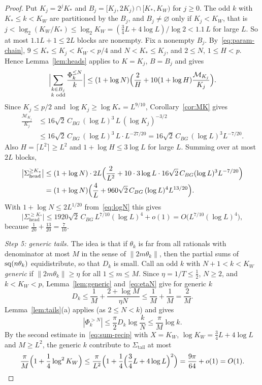 \begin{proof}
Put $K_j=2^jK_*$ and $B_j=[K_j,2K_j)\cap[K_*,K_W)$ for $j\ge0$. The odd $k$ with $K_*\le k<K_W$ are partitioned by the $B_j$, and $B_j\ne\varnothing$ only if $K_j<K_W$, that is $j<\log_2(K_W/K_*)\le\log_2K_W=(\frac34L+4\log L)/\log2<1.1\,L$ for large $L$. So at most $1.1L+1\le2L$ blocks are nonempty. Fix a nonempty $B_j$. By~\eqref{eq:param-chain}, $9\le K_*\le K_j<K_W<p/4$ and $N<K_*\le K_j$, and $2\le N$, $1\le H<p$. Hence Lemma~\ref{lem:heads} applies to $K=K_j$, $B=B_j$ and gives
\[
\Bigl|\sum_{\substack{k\in B_j\\ k\text{ odd}}}\frac{\Phi_k^{\le N}}k\Bigr|\le(1+\log N)\Bigl(\frac2H+10(1+\log H)\frac{\mathcal M_{K_j}}{K_j}\Bigr).
\]
Since $K_j\le p/2$ and $\log K_j\ge\log K_*=L^{9/10}$, Corollary~\ref{cor:MK} gives
\begin{align*}
\frac{\mathcal M_{K_j}}{K_j}&\le16\sqrt2\,C_{BG}\,(\log L)^3\,L\,(\log K_j)^{-3/2}\\
&\le16\sqrt2\,C_{BG}\,(\log L)^3\,L\cdot L^{-27/20}=16\sqrt2\,C_{BG}\,(\log L)^3L^{-7/20}.
\end{align*}
Also $H=\lceil L^2\rceil\ge L^2$ and $1+\log H\le3\log L$ for large $L$. Summing over at most $2L$ blocks,
\begin{align*}
\bigl|\Sigma_{\mathrm{head}}^{\ge K_*}\bigr|
&\le(1+\log N)\cdot2L\Bigl(\frac2{L^2}+10\cdot3\log L\cdot16\sqrt2\,C_{BG}(\log L)^3L^{-7/20}\Bigr)\\
&=(1+\log N)\Bigl(\frac4L+960\sqrt2\,C_{BG}\,(\log L)^4L^{13/20}\Bigr).
\end{align*}
With $1+\log N\le2L^{1/20}$ from~\eqref{eq:logN} this gives
\begin{equation}\label{eq:head-high}
\bigl|\Sigma_{\mathrm{head}}^{\ge K_*}\bigr|\le1920\sqrt2\,C_{BG}\,L^{7/10}(\log L)^4+o(1)=O\bigl(L^{7/10}(\log L)^4\bigr),
\end{equation}
because $\frac1{20}+\frac{13}{20}=\frac7{10}$.

\smallskip
\emph{Step 5: generic tails.} The idea is that if $\theta_k$ is far from all rationals with denominator at most $M$ in the sense of $\|2m\theta_k\|$, then the partial sums of $\operatorname{sq}(n\theta_k)$ equidistribute, so that $D_k$ is small. Call an odd $k$ with $N+1<k<K_W$ \emph{generic} if $\|2m\theta_k\|\ge\eta$ for all $1\le m\le M$. Since $\eta=1/T\le\frac12$, $N\ge2$, and $k<K_W<p$, Lemma~\ref{lem:generic} and~\eqref{eq:etaN} give for generic $k$
\[
D_k\le\frac1M+\frac{2+\log M}{\eta N}\le\frac1M+\frac1M=\frac2M .
\]
Lemma~\ref{lem:tails}(a) applies (as $2\le N<k$) and gives
\[
|\Phi_k^{>N}|\le\frac\pi2D_k\log\frac kN\le\frac\pi M\log k .
\]
By the second estimate in~\eqref{eq:sum-recip} with $X=K_W$, $\log K_W=\frac34L+4\log L$ and $M\ge L^2$, the generic $k$ contribute to $\Sigma_{\mathrm{tail}}$ at most
\begin{equation}\label{eq:generic}
\frac\pi M\Bigl(1+\frac14\log^2K_W\Bigr)\le\frac\pi{L^2}\Bigl(1+\frac14\Bigl(\frac34L+4\log L\Bigr)^2\Bigr)=\frac{9\pi}{64}+o(1)=O(1).
\end{equation}


\end{proof}
